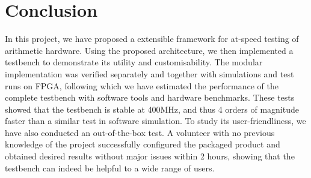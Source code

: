 \chapter{Conclusion}

In this project, we have proposed a extensible framework for at-speed testing of arithmetic hardware.
Using the proposed architecture, we then implemented a testbench to demonstrate its utility and customisability.
The modular implementation was verified separately and together with simulations and test runs on FPGA, following which we have estimated the performance of the complete testbench with software tools and hardware benchmarks.
These tests showed that the testbench is stable at 400MHz, and thus 4 orders of magnitude faster than a similar test in software simulation.
To study its user-friendliness, we have also conducted an out-of-the-box test.
A volunteer with no previous knowledge of the project successfully configured the packaged product and obtained desired results without major issues within 2 hours, showing that the testbench can indeed be helpful to a wide range of users.
